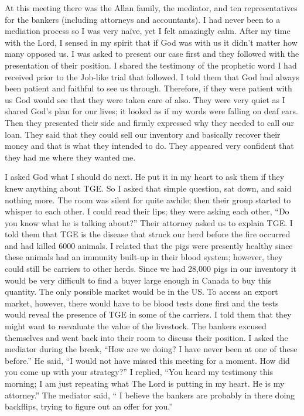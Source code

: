 \documentclass[twoside, 12pt]{book}
\begin{document}
At this meeting there was the Allan family, the mediator, and ten representatives for the bankers (including attorneys and accountants). I had never been to a mediation process so I was very naïve, yet I felt amazingly calm. After my time with the Lord, I sensed in my spirit that if God was with us it didn’t matter how many opposed us. I was asked to present our case first and they followed with the presentation of their position. I shared the testimony of the prophetic word I had received prior to the Job-like trial that followed. I told them that God had always been patient and faithful to see us through. Therefore, if they were patient with us God would see that they were taken care of also. They were very quiet as I shared God's plan for our lives; it looked as if my words were falling on deaf ears. Then they presented their side and firmly expressed why they needed to call our loan. They said that they could sell our inventory and basically recover their money and that is what they intended to do. They appeared very confident that they had me where they wanted me.

I asked God what I should do next. He put it in my heart to ask them if they knew anything about TGE. So I asked that simple question, sat down, and said nothing more. The room was silent for quite awhile; then their group started to whisper to each other. I could read their lips; they were asking each other, “Do you know what he is talking about?” Their attorney asked us to explain TGE. I told them that TGE is the disease that struck our herd before the fire occurred and had killed 6000 animals. I related that the pigs were presently healthy since these animals had an immunity built-up in their blood system; however, they could still be carriers to other herds. Since we had 28,000 pigs in our inventory it would be very difficult to find a buyer large enough in Canada to buy this quantity. The only possible market would be in the US. To access an export market, however, there would have to be blood tests done first and the tests would reveal the presence of TGE in some of the carriers. I told them that they might want to reevaluate the value of the livestock. The bankers excused themselves and went back into their room to discuss their position. I asked the mediator during the break, “How are we doing? I have never been at one of these before.”  He said, “I would not have missed this meeting for a moment. How did you come up with your strategy?” I replied, “You heard my testimony this morning; I am just repeating what The Lord is putting in my heart. He is my attorney.” The mediator said, “ I believe the bankers are probably in there doing backflips, trying to figure out an offer for you.”
\end{document}
